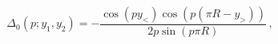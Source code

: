 \begin{equation}
\Delta_0(p;y_1,y_2) = - \frac{\cos (p y_<) \cos(p(\pi R-y_>))} {2 p
\sin (p\pi R)} \, ,
\end{equation}

